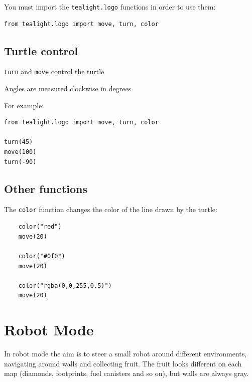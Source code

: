 \documentclass[12pt,a4paper,twoside]{article}
\renewcommand{\_}{\texttt{\symbol{95}}}
\begin{document}
You must import the \verb^tealight.logo^ functions in order to use them:

\begin{verbatim}
from tealight.logo import move, turn, color
\end{verbatim}

\subsection{Turtle control}

\begin{bulletlist}
\item \verb^turn^ and \verb^move^ control the turtle
\item Angles are measured clockwise in degrees
\end{bulletlist}

For example:
\begin{verbatim}
from tealight.logo import move, turn, color

turn(45)
move(100)
turn(-90)
\end{verbatim}

\subsection{Other functions}

\begin{bulletlist}
\item The \verb^color^ function changes the color of the line drawn by the turtle:

	\begin{verbatim}
	color("red")
	move(20)

	color("#0f0")
	move(20)

	color("rgba(0,0,255,0.5)")
	move(20)
	\end{verbatim}
\end{bulletlist}



\newpage
\section{Robot Mode} \label{sec:robot-mode}

In robot mode the aim is to steer a small robot around different
environments, navigating around walls and collecting fruit. The
fruit looks different on each map (diamonds, footprints, fuel canisters and so on), but
walls are always gray.
\end{document}
